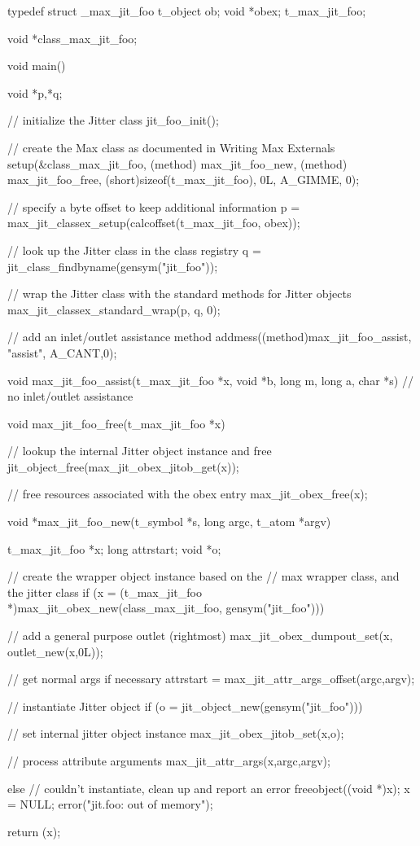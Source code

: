 \begin{DoxyCode}
typedef struct _max_jit_foo
{
   t_object       ob;
   void         *obex;
} t_max_jit_foo;

void *class_max_jit_foo;

void main()
{   
   void *p,*q;
   
   // initialize the Jitter class
   jit_foo_init(); 
   
   // create the Max class as documented in Writing Max Externals
   setup(&class_max_jit_foo, 
      (method) max_jit_foo_new, 
      (method) max_jit_foo_free, 
      (short)sizeof(t_max_jit_foo), 
      0L, A_GIMME, 0);

   // specify a byte offset to keep additional information
   p = max_jit_classex_setup(calcoffset(t_max_jit_foo, obex));
   
   // look up the Jitter class in the class registry
   q = jit_class_findbyname(gensym("jit_foo"));    
   
   // wrap the Jitter class with the standard methods for Jitter objects
   max_jit_classex_standard_wrap(p, q, 0);    

   // add an inlet/outlet assistance method
   addmess((method)max_jit_foo_assist, "assist", A_CANT,0);
}

void max_jit_foo_assist(t_max_jit_foo *x, void *b, long m, long a, char *s)
{
   // no inlet/outlet assistance
}

void max_jit_foo_free(t_max_jit_foo *x)
{
   // lookup the internal Jitter object instance and free
   jit_object_free(max_jit_obex_jitob_get(x));
   
   // free resources associated with the obex entry
   max_jit_obex_free(x);
}

void *max_jit_foo_new(t_symbol *s, long argc, t_atom *argv)
{
   t_max_jit_foo *x;
   long attrstart;
   void *o;

   // create the wrapper object instance based on the
   // max wrapper class, and the jitter class 
   if (x = (t_max_jit_foo *)max_jit_obex_new(class_max_jit_foo, 
         gensym("jit_foo"))) 
   {
      // add a general purpose outlet (rightmost)
      max_jit_obex_dumpout_set(x, outlet_new(x,0L));
      
      // get normal args if necessary
      attrstart = max_jit_attr_args_offset(argc,argv);
      
      // instantiate Jitter object
      if (o = jit_object_new(gensym("jit_foo"))) 
      {
         // set internal jitter object instance 
         max_jit_obex_jitob_set(x,o);
         
         // process attribute arguments
         max_jit_attr_args(x,argc,argv);
      } 
      else 
      {   
         // couldn't instantiate, clean up and report an error
         freeobject((void *)x);
         x = NULL;
         error("jit.foo: out of memory");
      }
   }

   return (x);
}
\end{DoxyCode}
